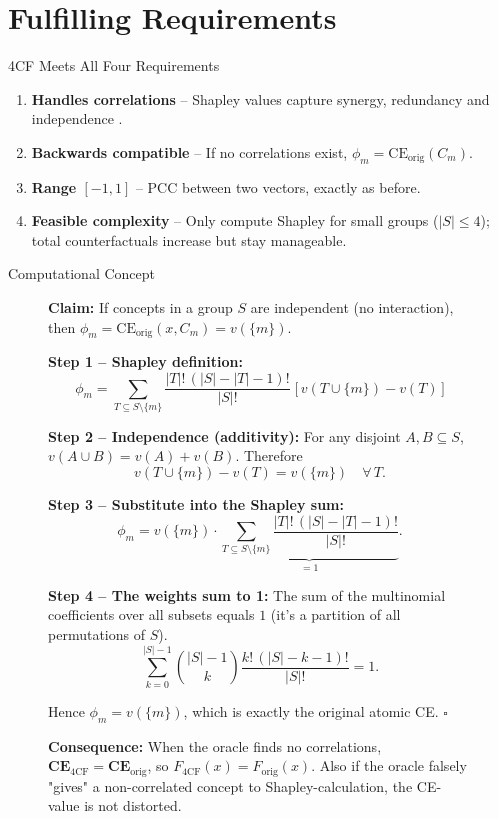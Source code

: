 \documentclass[aspectratio=169]{beamer}
\begin{document}
\section{Fulfilling Requirements}
\begin{frame}{4CF Meets All Four Requirements}
\begin{enumerate}
  \item \textbf{Handles correlations} – Shapley values capture synergy, redundancy and independence \cite{ittnerFeatureSynergyRedundancy2021}.
  \item \textbf{Backwards compatible} – If no correlations exist, $\phi_m = \mathrm{CE}_{\text{orig}}(C_m)$.
  \item \textbf{Range $[-1,1]$} – PCC between two vectors, exactly as before.
  \item \textbf{Feasible complexity} – Only compute Shapley for small groups ($|S|\le 4$); total counterfactuals increase but stay manageable.
\end{enumerate}
\vspace{0.4cm}
\end{frame}

\begin{frame}[shrink=20]{Computational Concept}
\footnotesize
\begin{figure}
\textbf{Claim:} If concepts in a group $S$ are independent (no interaction), then $\phi_m = \mathrm{CE}_{\text{orig}}(x,C_m) = v(\{m\})$.
\medskip

\textbf{Step 1 – Shapley definition:}
\[
\phi_m = \sum_{T \subseteq S\setminus\{m\}} \frac{|T|!\,(|S|-|T|-1)!}{|S|!}\; \big[\,v(T\cup\{m\}) - v(T)\,\big]
\]

\textbf{Step 2 – Independence (additivity):}
For any disjoint $A,B\subseteq S$, $v(A\cup B) = v(A) + v(B)$. Therefore
\[
v(T\cup\{m\}) - v(T) = v(\{m\}) \quad \forall\,T.
\]

\textbf{Step 3 – Substitute into the Shapley sum:}
\[
\phi_m = v(\{m\}) \cdot \underbrace{\sum_{T \subseteq S\setminus\{m\}} \frac{|T|!\,(|S|-|T|-1)!}{|S|!}}_{=1}.
\]

\textbf{Step 4 – The weights sum to 1:}
The sum of the multinomial coefficients over all subsets equals $1$ (it’s a partition of all permutations of $S$).
\[
\sum_{k=0}^{|S|-1} \binom{|S|-1}{k} \frac{k!\,(|S|-k-1)!}{|S|!} = 1.
\]

\pause
Hence $\phi_m = v(\{m\})$, which is exactly the original atomic CE. $\square$
\medskip

\textbf{Consequence:} When the oracle finds no correlations, $\mathbf{CE}_{\text{4CF}} = \mathbf{CE}_{\text{orig}}$, so $F_{\text{4CF}}(x) = F_{\text{orig}}(x)$. Also if the oracle falsely "gives" a non-correlated concept to Shapley-calculation, the CE-value is not distorted.

\end{figure}
\end{frame}
\end{document}

